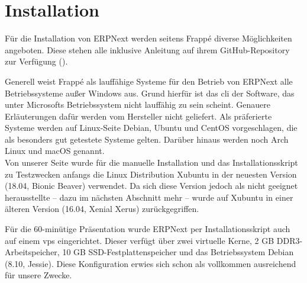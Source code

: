 \chapter{Installation}
\label{chap:inst}

Für die Installation von ERPNext werden seitens Frappé diverse Möglichkeiten angeboten. Diese stehen alle inklusive Anleitung auf ihrem GitHub-Repository zur Verfügung (\vgl \cite{GhBench}).

Generell weist Frappé als lauffähige Systeme für den Betrieb von ERPNext alle Betriebssysteme außer Windows aus. Grund hierfür ist das \gls{cli} der Software, das unter Microsofts Betriebssystem nicht lauffähig zu sein scheint. Genauere Erläuterungen dafür werden vom Hersteller nicht geliefert. Als präferierte Systeme werden auf Linux-Seite Debian, Ubuntu und CentOS vorgeschlagen, die als besonders gut getestete Systeme gelten. Darüber hinaus werden noch Arch Linux und macOS genannt. \\
Von unserer Seite wurde für die manuelle Installation und das Installationsskript zu Testzwecken anfangs die Linux Distribution Xubuntu in der neuesten Version (18.04, \glqq Bionic Beaver\grqq) verwendet. Da sich diese Version jedoch als nicht geeignet herausstellte – dazu im nächsten Abschnitt mehr – wurde auf Xubuntu in einer älteren Version (16.04, \glqq Xenial Xerus\grqq) zurückgegriffen.
 
Für die 60-minütige Präsentation wurde ERPNext per Installationsskript auch auf einem \gls{vps} eingerichtet. Dieser verfügt über zwei virtuelle Kerne, 2 GB DDR3-Arbeitspeicher, 10 GB SSD-Festplattenspeicher und das Betriebssystem Debian (8.10, Jessie). Diese Konfiguration erwies sich schon als vollkommen ausreichend für unsere Zwecke.

